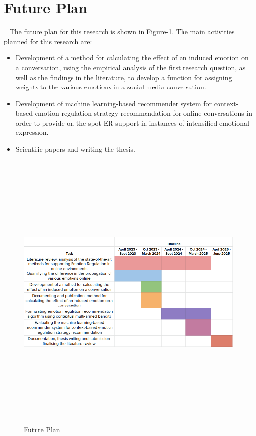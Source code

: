 \newpage 
\section{Future Plan}~\label{sec:discussion}
The future plan for this research is shown in Figure-\ref{fig:plan}. The main activities planned for this research are:
\begin{itemize}
    \item Development of a method for calculating the effect of an induced emotion on a conversation, using the empirical analysis of the first research question, as well as the findings in the literature, to develop a function for assigning weights to the various emotions in a social media conversation.
    \item Development of machine learning-based recommender system for context-based emotion regulation strategy recommendation for online conversations in order to provide on-the-spot ER support in instances of intensified emotional expression.
    \item Scientific papers and writing the thesis.
\end{itemize}
\begin{figure}[h]
  
    \centering
    \includegraphics[width=14cm,height=14cm,keepaspectratio]{plan.png}
  \caption{Future Plan}
  \label{fig:plan}
  \end{figure} 

